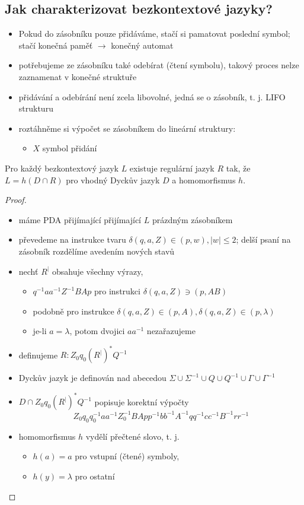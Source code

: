 \documentclass[../main.tex]{subfiles}
\begin{document}
\subsection{Jak charakterizovat bezkontextové jazyky?}
\begin{itemize}
    \item Pokud do zásobníku pouze přidáváme, stačí si pamatovat poslední symbol; stačí konečná paměť $\rightarrow$ konečný automat
    \item potřebujeme ze zásobníku také odebírat (čtení symbolu), takový proces nelze zaznamenat v konečné struktuře
    \item přidávání a odebírání není zcela libovolné, jedná se o zásobník, t. j. LIFO strukturu
    \item roztáhněme si výpočet se zásobníkem do lineární struktury:
    \begin{itemize}
        \item $X$ symbol přidání
    \end{itemize}
\end{itemize}
\begin{theorem}
    Pro každý bezkontextový jazyk $L$ existuje regulární jazyk $R$ tak, že $L = h(D\cap R)$ pro vhodný Dyckův jazyk $D$ a homomorfismus $h$.
    \begin{proof}
        \begin{itemize}
            \item máme PDA přijímající přijímající $L$ prázdným zásobníkem
            \item převedeme na instrukce tvaru $\delta(q,a,Z)\in (p,w),|w|\leq 2$; delší psaní na zásobník rozdělíme avedením nových stavů
            \item nechť $R^|$ obsahuje všechny výrazy,
            \begin{itemize}
                \item $q^{-1}aa^{-1}Z^{-1}BAp$ pro instrukci $\delta(q,a,Z)\ni (p,AB)$
                \item podobně pro instrukce $\delta(q,a,Z)\in (p,A), \delta(q,a,Z) \in (p,\lambda)$
                \item je-li $a=\lambda$, potom dvojici $aa^{-1}$ nezařazujeme
            \end{itemize}
            \item definujeme $R : Z_0q_0(R^|)^*Q^{-1}$
            \item Dyckův jazyk je definován nad abecedou $\Sigma\cup \Sigma^{-1}\cup Q\cup Q^{-1}\cup \Gamma \cup \Gamma^{-1}$
            \item $D\cap Z_0q_0(R^|)^*Q^{-1}$ popisuje korektní výpočty
            \[Z_0q_0q^{-1}_0aa^{-1}Z^{-1}_0 BApp^{-1}bb^{-1}A^{-1}qq^{-1}cc^{-1}B^{-1}rr^{-1}\]
            \item homomorfismus $h$ vydělí přečtené slovo, t. j.
            \begin{itemize}
                \item $h(a) = a$ pro vstupní (čtené) symboly,
                \item $h(y) = \lambda$ pro ostatní
            \end{itemize}
        \end{itemize}
    \end{proof}
\end{theorem}
\end{document}
